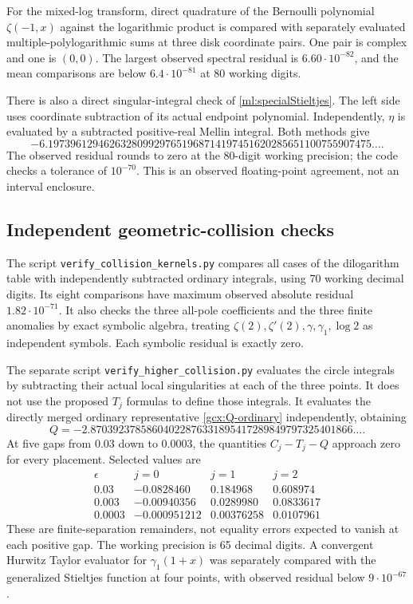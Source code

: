 \documentclass[11pt]{article}
\numberwithin{equation}{section}
\theoremstyle{plain}
\theoremstyle{definition}
\theoremstyle{remark}
\newcommand{\src}[1]{\texttt{\small\nolinkurl{#1}}}
\begin{document}
For the mixed-log transform, direct quadrature of the Bernoulli
polynomial $\zeta(-1,x)$ against the logarithmic product is compared
with separately evaluated multiple-polylogarithmic sums at three disk
coordinate pairs. One pair is complex and one is $(0,0)$.
The largest observed spectral residual is
$6.60\cdot10^{-82}$, and the mean comparisons are below
$6.4\cdot10^{-81}$ at 80 working digits.

There is also a direct singular-integral check of
\eqref{ml:specialStieltjes}. The left side uses coordinate subtraction
of its actual endpoint polynomial. Independently, $\eta$ is evaluated
by a subtracted positive-real Mellin integral. Both methods give
\[
 -6.1973961294626328099297651968714197451620285651100755907475\ldots.
\]
The observed residual rounds to zero at the 80-digit working precision;
the code checks a tolerance of $10^{-70}$. This is an observed
floating-point agreement, not an interval enclosure.

\subsection{Independent geometric-collision checks}

The script \src{verify_collision_kernels.py} compares all cases of the
dilogarithm table with independently subtracted ordinary integrals,
using 70 working decimal digits. Its eight comparisons have maximum
observed absolute residual $1.82\cdot10^{-71}$.
It also checks the three all-pole coefficients and the three finite
anomalies by exact symbolic algebra, treating
$\zeta(2),\zeta'(2),\gamma,\gamma_1,\log2$ as independent symbols.
Each symbolic residual is exactly zero.

The separate script \src{verify_higher_collision.py} evaluates the
circle integrals by subtracting their actual local singularities at
each of the three points. It does not use the proposed $T_j$ formulas
to define those integrals. It evaluates the directly merged ordinary
representative \eqref{gcx:Q-ordinary} independently, obtaining
\[
 Q=-2.87039237858604022876331895417289849797325401866\ldots.
\]
At five gaps from $0.03$ down to $0.0003$, the quantities $C_j-T_j-Q$
approach zero for every placement. Selected values are
\[
\begin{array}{c|rrr}
 \epsilon&j=0&j=1&j=2\\ \hline
 0.03&-0.0828460&0.184968&0.608974\\
 0.003&-0.00940356&0.0289980&0.0833617\\
 0.0003&-0.000951212&0.00376258&0.0107961
\end{array}
\]
These are finite-separation remainders, not equality errors expected
to vanish at each positive gap. The working precision is 65 decimal
digits. A convergent Hurwitz Taylor evaluator for $\gamma_1(1+x)$
was separately compared with the generalized Stieltjes function at
four points, with observed residual below $9\cdot10^{-67}$.
\end{document}
